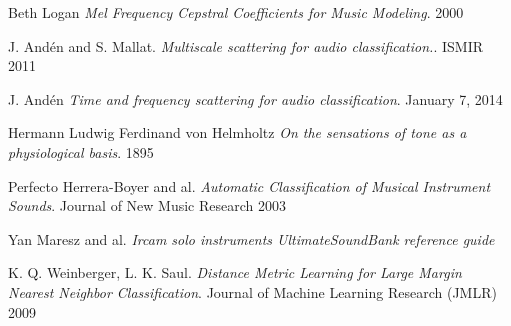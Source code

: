 \documentclass[hidelinks,12pt]{report}
\begin{document}
\newpage
\begin{thebibliography}{2}
Beth Logan
\textit{Mel Frequency Cepstral Coefficients for Music Modeling}. 
2000

J. Andén and S. Mallat. 
\textit{Multiscale scattering for audio classification.}. 
ISMIR 2011

J. Andén 
\textit{Time and frequency scattering for audio classification}. 
January 7, 2014

Hermann Ludwig Ferdinand von Helmholtz
\textit{On the sensations of tone as a physiological basis}.
1895


Perfecto Herrera-Boyer and al.
\textit{Automatic Classification of Musical Instrument Sounds}.
Journal of New Music Research 2003


Yan Maresz and al.
\textit{Ircam solo instruments UltimateSoundBank reference guide}

K. Q. Weinberger, L. K. Saul. 
\textit{Distance Metric Learning for Large Margin Nearest Neighbor Classification}.
Journal of Machine Learning Research (JMLR) 2009



\end{thebibliography}
\end{document}
